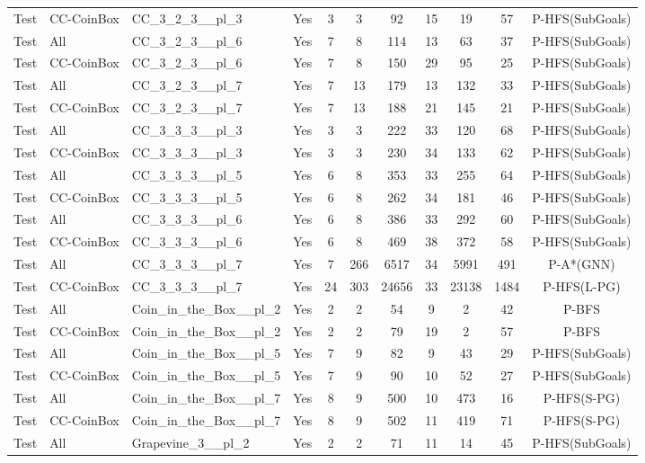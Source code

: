\documentclass{article}
\begin{document}
\begin{tabular}{lllcccccccc}
Test & CC-CoinBox & CC\_3\_2\_3\_\_pl\_3 & Yes & 3 & 3 & 92 & 15 & 19 & 57 & P-HFS(SubGoals) \\
Test & All & CC\_3\_2\_3\_\_pl\_6 & Yes & 7 & 8 & 114 & 13 & 63 & 37 & P-HFS(SubGoals) \\
Test & CC-CoinBox & CC\_3\_2\_3\_\_pl\_6 & Yes & 7 & 8 & 150 & 29 & 95 & 25 & P-HFS(SubGoals) \\
Test & All & CC\_3\_2\_3\_\_pl\_7 & Yes & 7 & 13 & 179 & 13 & 132 & 33 & P-HFS(SubGoals) \\
Test & CC-CoinBox & CC\_3\_2\_3\_\_pl\_7 & Yes & 7 & 13 & 188 & 21 & 145 & 21 & P-HFS(SubGoals) \\
Test & All & CC\_3\_3\_3\_\_pl\_3 & Yes & 3 & 3 & 222 & 33 & 120 & 68 & P-HFS(SubGoals) \\
Test & CC-CoinBox & CC\_3\_3\_3\_\_pl\_3 & Yes & 3 & 3 & 230 & 34 & 133 & 62 & P-HFS(SubGoals) \\
Test & All & CC\_3\_3\_3\_\_pl\_5 & Yes & 6 & 8 & 353 & 33 & 255 & 64 & P-HFS(SubGoals) \\
Test & CC-CoinBox & CC\_3\_3\_3\_\_pl\_5 & Yes & 6 & 8 & 262 & 34 & 181 & 46 & P-HFS(SubGoals) \\
Test & All & CC\_3\_3\_3\_\_pl\_6 & Yes & 6 & 8 & 386 & 33 & 292 & 60 & P-HFS(SubGoals) \\
Test & CC-CoinBox & CC\_3\_3\_3\_\_pl\_6 & Yes & 6 & 8 & 469 & 38 & 372 & 58 & P-HFS(SubGoals) \\
Test & All & CC\_3\_3\_3\_\_pl\_7 & Yes & 7 & 266 & 6517 & 34 & 5991 & 491 & P-A*(GNN) \\
Test & CC-CoinBox & CC\_3\_3\_3\_\_pl\_7 & Yes & 24 & 303 & 24656 & 33 & 23138 & 1484 & P-HFS(L-PG) \\
Test & All & Coin\_in\_the\_Box\_\_pl\_2 & Yes & 2 & 2 & 54 & 9 & 2 & 42 & P-BFS \\
Test & CC-CoinBox & Coin\_in\_the\_Box\_\_pl\_2 & Yes & 2 & 2 & 79 & 19 & 2 & 57 & P-BFS \\
Test & All & Coin\_in\_the\_Box\_\_pl\_5 & Yes & 7 & 9 & 82 & 9 & 43 & 29 & P-HFS(SubGoals) \\
Test & CC-CoinBox & Coin\_in\_the\_Box\_\_pl\_5 & Yes & 7 & 9 & 90 & 10 & 52 & 27 & P-HFS(SubGoals) \\
Test & All & Coin\_in\_the\_Box\_\_pl\_7 & Yes & 8 & 9 & 500 & 10 & 473 & 16 & P-HFS(S-PG) \\
Test & CC-CoinBox & Coin\_in\_the\_Box\_\_pl\_7 & Yes & 8 & 9 & 502 & 11 & 419 & 71 & P-HFS(S-PG) \\
Test & All & Grapevine\_3\_\_pl\_2 & Yes & 2 & 2 & 71 & 11 & 14 & 45 & P-HFS(SubGoals) \\

\end{tabular}
\end{document}
